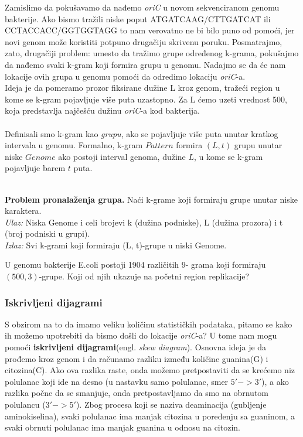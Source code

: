 Zamislimo da pokušavamo da nađemo \textit{oriC} u novom sekvenciranom genomu bakterije. Ako bismo tražili niske poput ATGATCAAG/CTTGATCAT ili CCTACCACC/GGTGGTAGG to nam verovatno ne bi bilo puno od pomoći, jer novi genom može koristiti potpuno drugačiju skrivenu poruku. Posmatrajmo, zato, drugačiji problem: umesto da tražimo grupe određenog k-grama, pokušajmo da nađemo svaki k-gram koji formira grupu u genomu. Nadajmo se da će nam lokacije ovih grupa u genomu pomoći da odredimo lokaciju \textit{oriC}-a.\\Ideja je da pomeramo prozor fiksirane dužine L kroz genom, tražeći region u kome se k-gram pojavljuje više puta uzastopno. Za L ćemo uzeti vrednost 500, koja predstavlja najčešću dužinu \textit{oriC}-a kod bakterija. \\\\
Definisali smo k-gram kao \textit{grupu}, ako se pojavljuje više puta unutar kratkog intervala u genomu. Formalno, k-gram $Pattern$ formira $(L, t)$ grupu unutar niske $Genome$ ako postoji interval genoma, dužine $L$, u kome se k-gram pojavljuje barem $t$ puta. \\\\
\begin{tcolorbox}
\textbf{Problem pronalaženja grupa.} Naći k-grame koji
formiraju grupe unutar niske karaktera.\\
\textit{Ulaz:} Niska Genome i celi brojevi k (dužina
podniske), L (dužina prozora) i t (broj podniski u
grupi).\\
\textit{Izlaz:} Svi k-grami koji formiraju (L, t)-grupe u
niski Genome.
\end{tcolorbox}

U genomu bakterije E.coli postoji 1904 različitih 9-
grama koji formiraju $(500,3)$-grupe. Koji od njih
ukazuje na početni region replikacije?

\subsubsection{Iskrivljeni dijagrami}

S obzirom na to da imamo veliku količinu statističkih podataka, pitamo se kako ih možemo upotrebiti da bismo došli do lokacije \textit{oriC}-a? U tome nam mogu pomoći \textbf{iskrivljeni dijagrami}(engl. \textit{skew diagram}). Osnovna ideja je da prođemo kroz genom i da računamo razliku između količine guanina(G) i citozina(C). Ako ova razlika raste, onda možemo pretpostaviti da se krećemo niz polulanac koji ide na desno (u nastavku samo polulanac, smer $5'-> 3'$), a ako razlika počne da se smanjuje, onda pretpostavljamo da smo na obrnutom polulancu ($3' -> 5'$). Zbog procesa koji se naziva deaminacija (gubljenje aminokiselina), svaki polulanac ima manjak citozina u poređenju sa guaninom, a svaki obrnuti polulanac ima manjak guanina u odnosu na citozin. 

